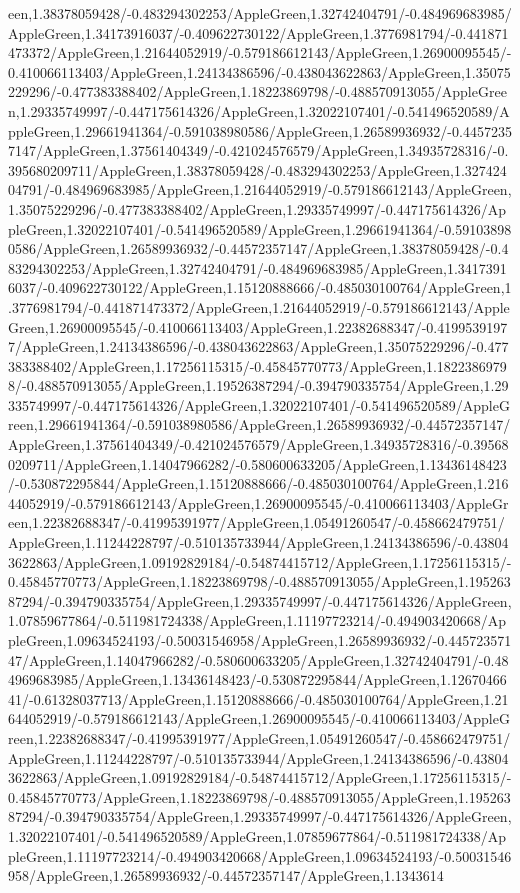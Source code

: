 {\begin{tikzternal}
{een,1.38378059428/-0.483294302253/AppleGreen,1.32742404791/-0.484969683985/AppleGreen,1.34173916037/-0.409622730122/AppleGreen,1.3776981794/-0.441871473372/AppleGreen,1.21644052919/-0.579186612143/AppleGreen,1.26900095545/-0.410066113403/AppleGreen,1.24134386596/-0.438043622863/AppleGreen,1.35075229296/-0.477383388402/AppleGreen,1.18223869798/-0.488570913055/AppleGreen,1.29335749997/-0.447175614326/AppleGreen,1.32022107401/-0.541496520589/AppleGreen,1.29661941364/-0.591038980586/AppleGreen,1.26589936932/-0.44572357147/AppleGreen,1.37561404349/-0.421024576579/AppleGreen,1.34935728316/-0.395680209711/AppleGreen,1.38378059428/-0.483294302253/AppleGreen,1.32742404791/-0.484969683985/AppleGreen,1.21644052919/-0.579186612143/AppleGreen,1.35075229296/-0.477383388402/AppleGreen,1.29335749997/-0.447175614326/AppleGreen,1.32022107401/-0.541496520589/AppleGreen,1.29661941364/-0.591038980586/AppleGreen,1.26589936932/-0.44572357147/AppleGreen,1.38378059428/-0.483294302253/AppleGreen,1.32742404791/-0.484969683985/AppleGreen,1.34173916037/-0.409622730122/AppleGreen,1.15120888666/-0.485030100764/AppleGreen,1.3776981794/-0.441871473372/AppleGreen,1.21644052919/-0.579186612143/AppleGreen,1.26900095545/-0.410066113403/AppleGreen,1.22382688347/-0.41995391977/AppleGreen,1.24134386596/-0.438043622863/AppleGreen,1.35075229296/-0.477383388402/AppleGreen,1.17256115315/-0.45845770773/AppleGreen,1.18223869798/-0.488570913055/AppleGreen,1.19526387294/-0.394790335754/AppleGreen,1.29335749997/-0.447175614326/AppleGreen,1.32022107401/-0.541496520589/AppleGreen,1.29661941364/-0.591038980586/AppleGreen,1.26589936932/-0.44572357147/AppleGreen,1.37561404349/-0.421024576579/AppleGreen,1.34935728316/-0.395680209711/AppleGreen,1.14047966282/-0.580600633205/AppleGreen,1.13436148423/-0.530872295844/AppleGreen,1.15120888666/-0.485030100764/AppleGreen,1.21644052919/-0.579186612143/AppleGreen,1.26900095545/-0.410066113403/AppleGreen,1.22382688347/-0.41995391977/AppleGreen,1.05491260547/-0.458662479751/AppleGreen,1.11244228797/-0.510135733944/AppleGreen,1.24134386596/-0.438043622863/AppleGreen,1.09192829184/-0.54874415712/AppleGreen,1.17256115315/-0.45845770773/AppleGreen,1.18223869798/-0.488570913055/AppleGreen,1.19526387294/-0.394790335754/AppleGreen,1.29335749997/-0.447175614326/AppleGreen,1.07859677864/-0.511981724338/AppleGreen,1.11197723214/-0.494903420668/AppleGreen,1.09634524193/-0.50031546958/AppleGreen,1.26589936932/-0.44572357147/AppleGreen,1.14047966282/-0.580600633205/AppleGreen,1.32742404791/-0.484969683985/AppleGreen,1.13436148423/-0.530872295844/AppleGreen,1.1267046641/-0.61328037713/AppleGreen,1.15120888666/-0.485030100764/AppleGreen,1.21644052919/-0.579186612143/AppleGreen,1.26900095545/-0.410066113403/AppleGreen,1.22382688347/-0.41995391977/AppleGreen,1.05491260547/-0.458662479751/AppleGreen,1.11244228797/-0.510135733944/AppleGreen,1.24134386596/-0.438043622863/AppleGreen,1.09192829184/-0.54874415712/AppleGreen,1.17256115315/-0.45845770773/AppleGreen,1.18223869798/-0.488570913055/AppleGreen,1.19526387294/-0.394790335754/AppleGreen,1.29335749997/-0.447175614326/AppleGreen,1.32022107401/-0.541496520589/AppleGreen,1.07859677864/-0.511981724338/AppleGreen,1.11197723214/-0.494903420668/AppleGreen,1.09634524193/-0.50031546958/AppleGreen,1.26589936932/-0.44572357147/AppleGreen,1.1343614}
\end{tikzternal}}
